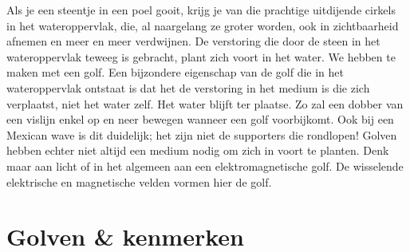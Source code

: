 \documentclass{ximera}
\begin{document}
	\author{Bart Lambregs}
    \xmsource



	Als je een steentje in een poel gooit, krijg je van die prachtige uitdijende cirkels in het wateroppervlak, die, al naargelang ze groter worden, ook in zichtbaarheid afnemen en meer en meer verdwijnen. De verstoring die door de steen in het wateroppervlak teweeg is gebracht, plant zich voort in het water. We hebben te maken met een golf.
	Een bijzondere eigenschap van de golf die in het wateroppervlak ontstaat is dat het de verstoring in het medium is die zich verplaatst, niet het water zelf. Het water blijft ter plaatse. Zo zal een dobber van een vislijn enkel op en neer bewegen wanneer een golf voorbijkomt. Ook bij een Mexican wave is dit duidelijk; het zijn niet de supporters die rondlopen!
	Golven hebben echter niet altijd een medium nodig om zich in voort te planten. Denk maar aan licht of in het algemeen aan een elektromagnetische golf. De wisselende elektrische en magnetische velden vormen hier de golf.
	
	
	
	\section{Golven \& kenmerken}
	
\end{document}
